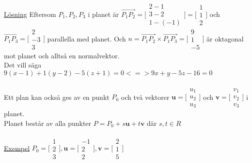 \documentclass{article}
\begin{document}
\\
\underline{Lösning} Eftersom \(P_1, P_2, P_3 \) i planet är \(\vec{P_1 P_2} = \bigl[\begin{smallmatrix}
2 - 1 \\ 3 - 2 \\ 1 - (-1)
\end{smallmatrix} \bigr] = \bigl[\begin{smallmatrix}
1 \\ 1 \\ 2
\end{smallmatrix} \bigr] \) och \(\vec{P_1 P_3} = \bigl[\begin{smallmatrix}
2 \\ -3 \\ 3
\end{smallmatrix} \bigr] \) parallella med planet. Och \(n = \vec{P_1 P_2} \times \vec{P_1 P_3} = \bigl[\begin{smallmatrix}
9 \\ 1 \\ -5
\end{smallmatrix} \bigr] \) är oktagonal mot planet och alltså en normalvektor.\\
Det vill säga \(9(x-1) + 1(y-2) - 5(z+1) = 0 <=> 9x + y - 5z -16 = 0 \)\\
\\
Ett plan kan också ges av en punkt \(P_0\) och två vektorer \(\mathbf{u} = \bigl[\begin{smallmatrix}
u_1 \\ u_2 \\ u_3
\end{smallmatrix} \bigr] \) och \(\mathbf{v} = \bigl[\begin{smallmatrix}
v_1 \\ v_2 \\ v_3
\end{smallmatrix} \bigr] \) i planet.\\
Planet består av alla punkter \(P = P_0 + s\mathbf{u} + t\mathbf{v} \) där \(s, t \in R \)\\
\\
\underline{Exempel} \(P_0 = \bigl[\begin{smallmatrix}
1 \\ 2 \\ 3
\end{smallmatrix} \bigr], \mathbf{u} = \bigl[\begin{smallmatrix}
-1 \\ 2 \\ 2
\end{smallmatrix} \bigr], \mathbf{v} = \bigl[\begin{smallmatrix}
2 \\ 1 \\ 5
\end{smallmatrix} \bigr] \)\\
\end{document}
